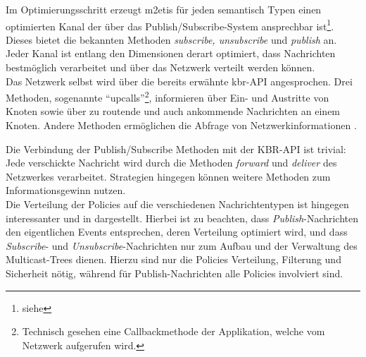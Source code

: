 Im Optimierungsschritt erzeugt \ac{m2etis} für jeden semantisch Typen einen optimierten Kanal der über das Publish/Subscribe-System ansprechbar ist\footnote{siehe }. Dieses bietet die bekannten Methoden \emph{subscribe, unsubscribe} und \emph{publish} an. Jeder Kanal ist entlang den Dimensionen derart optimiert, dass Nachrichten bestmöglich verarbeitet und über das Netzwerk verteilt werden können.\\
Das Netzwerk selbst wird über die bereits erwähnte \ac{kbr}-API angesprochen. Drei Methoden, sogenannte ``upcalls''\footnote{Technisch gesehen eine Callbackmethode der Applikation, welche vom Netzwerk aufgerufen wird.},  informieren über Ein- und Austritte von Knoten sowie über zu routende und auch ankommende Nachrichten an einem Knoten. Andere Methoden ermöglichen die Abfrage von Netzwerkinformationen \cite{Dabek2003Towards}.

Die Verbindung der Publish/Subscribe Methoden mit der KBR-API ist trivial: Jede verschickte Nachricht wird durch die Methoden \emph{forward} und \emph{deliver} des Netzwerkes verarbeitet. Strategien hingegen können weitere Methoden zum Informationsgewinn nutzen.\\
Die Verteilung der Policies auf die verschiedenen Nachrichtentypen ist hingegen interessanter und in  dargestellt. Hierbei ist zu beachten, dass \emph{Publish}-Nachrichten den eigentlichen Events entsprechen, deren Verteilung optimiert wird, und dass \emph{Subscribe}- und \emph{Unsubscribe}-Nachrichten nur zum Aufbau und der Verwaltung des Multicast-Trees dienen. Hierzu sind nur die Policies Verteilung, Filterung und Sicherheit nötig, während für Publish-Nachrichten alle Policies involviert sind.

\begin{table}[!h]
\caption{Verbindungsmatrix}
\label{tab:verbindungsmatrix}
\end{table}

